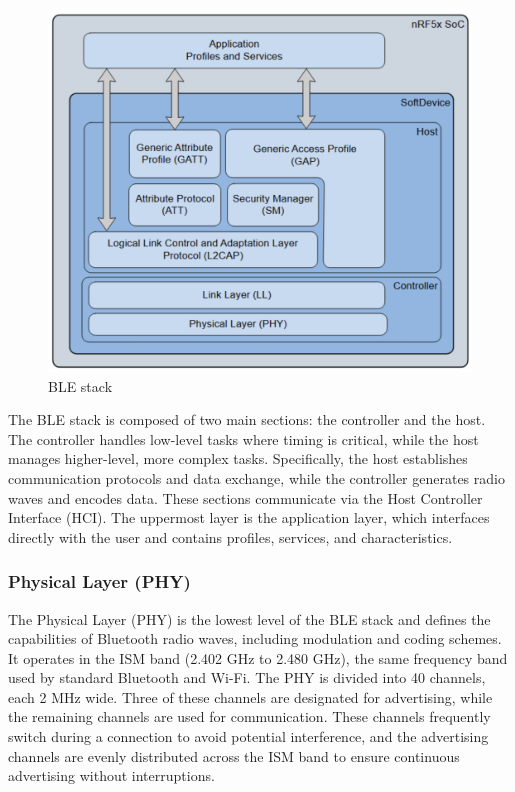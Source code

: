 \documentclass{Configuration_Files/PoliMi3i_thesis}
\begin{document}
\begin{figure}[h]
    \centering
    \includegraphics[width=\linewidth]{Bluetooth Low Energy/Screenshot 2024-08-15 at 23.25.52.png}
    \caption{BLE stack \cite{NordicSemiconductorInfocenter}}
    \label{ble_stack}
\end{figure}

The BLE stack is composed of two main sections: the controller and the host. The controller handles low-level tasks where timing is critical, while the host manages higher-level, more complex tasks. Specifically, the host establishes communication protocols and data exchange, while the controller generates radio waves and encodes data. These sections communicate via the Host Controller Interface (HCI). The uppermost layer is the application layer, which interfaces directly with the user and contains profiles, services, and characteristics.

\subsubsection{Physical Layer (PHY)}
The Physical Layer (PHY) is the lowest level of the BLE stack and defines the capabilities of Bluetooth radio waves, including modulation and coding schemes. It operates in the ISM band (2.402 GHz to 2.480 GHz), the same frequency band used by standard Bluetooth and Wi-Fi. The PHY is divided into 40 channels, each 2 MHz wide. Three of these channels are designated for advertising, while the remaining channels are used for communication. These channels frequently switch during a connection to avoid potential interference, and the advertising channels are evenly distributed across the ISM band to ensure continuous advertising without interruptions.
\end{document}
